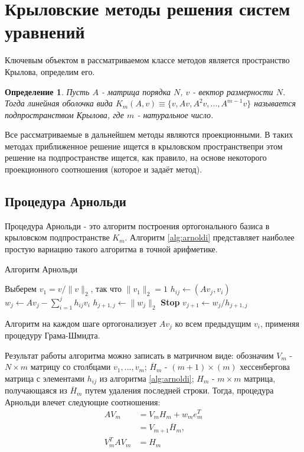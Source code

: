\section{Крыловские методы решения систем уравнений}
\label{sec:Chapter2} 
Ключевым объектом в рассматриваемом классе методов является пространство Крылова, определим его.
\newtheorem{definition}{Определение}
\begin{definition}
    Пусть $A$ - матрица порядка $N$, $v$ - вектор размерности $N$. Тогда линейная
    оболочка вида $K_m\left(A,v\right) \equiv \{v,Av,A^2v,...,A^{m-1}v\} $ называется 
    подпространством Крылова, где $m$ - натуральное число. 
\end{definition}
Все рассматриваемые в дальнейшем методы являются проекционными.
В таких методах приближенное решение ищется в крыловском пространствепри этом 
решение на подпространстве ищется, как правило, на основе некоторого проекционного
 соотношения (которое и задаёт метод).
\subsection{Процедура Арнольди}
Процедура Арнольди - это алгоритм построения ортогонального базиса в крыловском
подпространстве $K_m$. Алгоритм \ref{alg:arnoldi} представляет наиболее простую
вариацию такого алгоритма в точной арифметике.
\begin{algorithm}[H]
    \caption{Алгоритм Арнольди}\label{alg:arnoldi}
    \begin{algorithmic}[1]
    \State Выберем $v_1 = v / \|v\|_2$, так что $\|v_1\|_2 = 1$
    \Statex
            \State $h_{ij} \gets (Av_j, v_i)$
        \EndFor
        \State $w_j \gets Av_j - \sum_{i=1}^j h_{ij}v_i$
        \State $h_{j+1,j} \gets \|w_j\|_2$
            \State \textbf{Stop}
        \EndIf
        \State $v_{j+1} \gets w_j/h_{j+1,j}$
    \EndFor
    \end{algorithmic}
\end{algorithm}
Алгоритм на каждом шаге ортогонализует $Av_j$ ко всем предыдущим $v_i$, 
применяя процедуру Грама-Шмидта. 
\par Результат работы алгоритма можно записать в матричном
виде: обозначим $V_m$ - $N \times m$ матрицу со столбцами $v_1,...,v_m$; 
$\overline{H}_m$ - $\left(m+1\right) \times \left( m \right)$  хессенбергова матрица с 
элементами $h_{ij}$ из алгоритма \ref{alg:arnoldi}; ${H}_m$ - $ m \times m $ матрица, 
получающаяся из $\overline{H}_m$ путем удаления последней строки. Тогда, процедура Арнольди
влечет следующие соотношения:
\begin{align}
    AV_m &= V_m H_m + w_m e_m^T \\
         &= V_{m+1} \overline{H}_m,\\
    V_m^T A V_m &= H_m \label{eq:VAVHM}
\end{align} 
